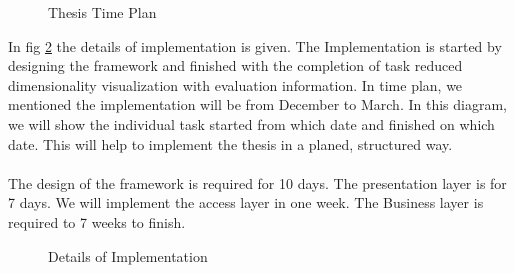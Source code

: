 \begin{figure}[htbp]
	\centering
	
	
	\caption{Thesis Time Plan}
	\label{fig:labelOfThesisTimePlan}
\end{figure}
In fig \ref{fig:labelOfThesisImplementation} the details of implementation is given. The Implementation is started by designing the framework and finished with the completion of task reduced dimensionality visualization with evaluation information. In time plan, we mentioned the implementation will be from December to March. In this diagram, we will show the individual task started from which date and finished on which date. This will help to implement the thesis in a planed, structured way.\\\\
The design of the framework is required for 10 days. The presentation layer is for 7 days. We will implement the access layer in one week. The Business layer is required to 7 weeks to finish.  
\begin{figure}[htbp]
	\centering
	
	
	\caption{Details of Implementation}
	\label{fig:labelOfThesisImplementation}
\end{figure}